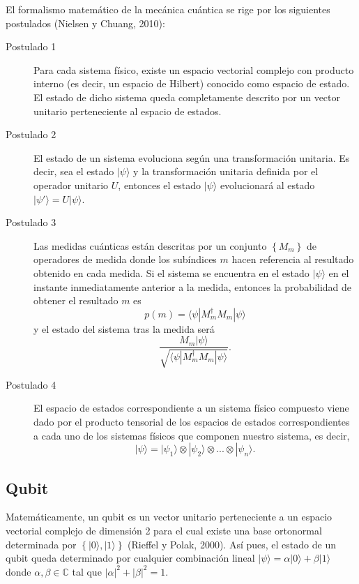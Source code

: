 El formalismo matemático de la mecánica cuántica se rige por los siguientes postulados (Nielsen y Chuang, 2010):

\begin{description}
    \item[Postulado 1] Para cada sistema físico, existe un espacio vectorial complejo con producto interno (es decir, un espacio de Hilbert) conocido como espacio de estado. El estado de dicho sistema queda completamente descrito por un vector unitario perteneciente al espacio de estados. 
    
    \item[Postulado 2] El estado de un sistema evoluciona según una transformación unitaria. Es decir, sea el estado $ | \psi \rangle$ y la transformación unitaria definida por el operador unitario $U$, entonces el estado $ | \psi \rangle $ evolucionará al estado $ | \psi' \rangle = U | \psi \rangle$.
    \item[Postulado 3] Las medidas cuánticas están descritas por un conjunto $ \left \{ M_m \right \}  $ de operadores de medida donde los subíndices $m$ hacen referencia al resultado obtenido en cada medida. Si el sistema se encuentra en el estado $ | \psi \rangle $ en el instante inmediatamente anterior a la medida, entonces la probabilidad de obtener el resultado $m$ es $$ p(m)= \langle \psi | M_m^\dagger M_m | \psi \rangle $$ y el estado del sistema tras la medida será $$ \frac{M_m | \psi \rangle}{\sqrt{\langle \psi | M_m^\dagger M_m | \psi \rangle}} . $$
    \item[Postulado 4] El espacio de estados correspondiente a un sistema físico compuesto viene dado por el producto tensorial de los espacios de estados correspondientes a cada uno de los sistemas físicos que componen nuestro sistema, es decir, $$| \psi \rangle = | \psi_1 \rangle \otimes | \psi_2 \rangle \otimes ... \otimes | \psi_n \rangle .$$
\end{description}

\subsection{Qubit}

Matemáticamente, un qubit es un vector unitario perteneciente a un espacio vectorial complejo de dimensión 2 para el cual existe una base ortonormal determinada por $ \left \{ | 0 \rangle , | 1 \rangle  \right \}$ (Rieffel y Polak, 2000). Así pues, el estado de un qubit queda determinado por cualquier combinación lineal $ | \psi \rangle = \alpha | 0 \rangle + \beta | 1 \rangle $ donde $ \alpha, \beta \in \mathbb{C} $ tal que $ | \alpha |^2 + | \beta |^2=1 $.

